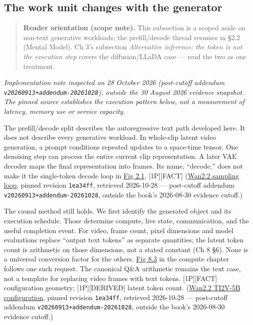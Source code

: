 \subsection{The work unit changes with the
generator}\label{the-work-unit-changes-with-the-generator}

\begin{quote}
\textbf{Reader orientation (scope note).} This subsection is a scoped
aside on non-text generative workloads; the prefill/decode thread
resumes in §2.2 (Mental Model). Ch 3's subsection \emph{Alternative
inference: the token is not the execution step} covers the
diffusion/LLaDA case --- read the two as one treatment.
\end{quote}

\emph{Implementation note inspected on 28 October 2026 (post-cutoff
addendum \texttt{v20260913+addendum-20261028}), outside the 30 August
2026 evidence snapshot. The pinned source establishes the execution
pattern below, not a measurement of latency, memory use or service
capacity.}

The prefill/decode split describes the autoregressive text path
developed here. It does not describe every generative workload. In
whole-clip latent video generation, a prompt conditions repeated updates
to a space-time tensor. One denoising step can process the entire
current clip representation. A later VAE decoder maps the final
representation into frames. Its name, ``decode,'' does not make it the
single-token decode loop in \hyperref[fig:2.1]{Fig 2.1}. \mbox{{[}1P{]}}\hspace{0pt}\mbox{{[}FACT{]}}
(\href{https://github.com/Wan-Video/Wan2.2/tree/1ea34ff48f87168174e12956e200b1d908b1c5ff}{Wan2.2
sampling loop}, pinned revision \texttt{1ea34ff}, retrieved 2026-10-28
--- post-cutoff addendum \texttt{v20260913+addendum-20261028}, outside
the book's 2026-08-30 evidence cutoff.)

The causal method still holds. We first identify the generated object
and its execution schedule. Those determine compute, live state,
communication, and the useful completion event. For video, frame count,
pixel dimensions and model evaluations replace ``output text tokens'' as
separate quantities; the latent token count is arithmetic on those
dimensions, not a stated constant (Ch 8 §6). None is a universal
conversion factor for the others. \hyperref[fig:8.3]{Fig 8.3} in the compute chapter
follows one such request. The canonical Q\&A arithmetic remains the text
case, not a template for replacing video frames with text tokens.
\mbox{{[}1P{]}}\hspace{0pt}\mbox{{[}FACT{]}} configuration geometry; \mbox{{[}1P{]}}\hspace{0pt}\mbox{{[}DERIVED{]}} latent
token count.
(\href{https://github.com/Wan-Video/Wan2.2/blob/1ea34ff48f87168174e12956e200b1d908b1c5ff/wan/configs/wan_ti2v_5B.py}{Wan2.2
TI2V-5B configuration}, pinned revision \texttt{1ea34ff}, retrieved
2026-10-28 --- post-cutoff addendum
\texttt{v20260913+addendum-20261028}, outside the book's 2026-08-30
evidence cutoff.)


